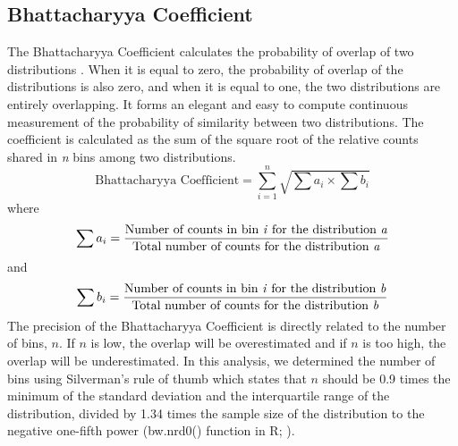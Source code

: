 \subsection{Bhattacharyya Coefficient}
The Bhattacharyya Coefficient calculates the probability of overlap of two distributions \citep{Bhattacharyya}. When it is equal to zero, the probability of overlap of the distributions is also zero, and when it is equal to one, the two distributions are entirely overlapping. It forms an elegant and easy to compute continuous measurement of the probability of similarity between two distributions. The coefficient is calculated as the sum of the square root of the relative counts shared in \textit{n} bins among two distributions.
\begin{equation}
\text{Bhattacharyya Coefficient}=\sum_{i=1}^{n} \sqrt{{\sum{a_i}}\times{\sum{b_i}}}
\end{equation}
where
\begin{equation}
\sum{a_i}=\frac{\text{Number of counts in bin \textit{i} for the distribution \textit{a}}}{\text{Total number of counts for the distribution \textit{a}}}
\end{equation}
and
\begin{equation}
\sum{b_i}=\frac{\text{Number of counts in bin \textit{i} for the distribution \textit{b}}}{\text{Total number of counts for the distribution \textit{b}}}
\end{equation}
The precision of the Bhattacharyya Coefficient is directly related to the number of bins, $n$. If $n$ is low, the overlap will be overestimated and if $n$ is too high, the overlap will be underestimated. In this analysis, we determined the number of bins using Silverman's rule of thumb which states that $n$ should be 0.9 times the minimum of the standard deviation and the interquartile range of the distribution, divided by 1.34 times the sample size of the distribution to the negative one-fifth power (bw.nrd0() function in R; \citet{silverman1986density}).
